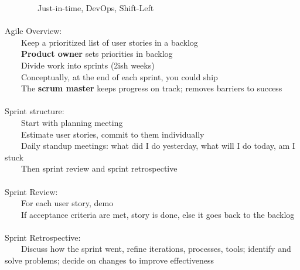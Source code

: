 \documentclass[10pt,letterpaper,unboxed,cm]{article}
\newcommand{\tab}{~~~~}
\begin{document}
\tab \tab Just-in-time, DevOps, Shift-Left\\\\
Agile Overview: \\
\tab Keep a prioritized list of user stories in a backlog\\
\tab \textbf{Product owner} sets priorities in backlog\\
\tab Divide work into sprints (2ish weeks)\\
\tab Conceptually, at the end of each sprint, you could ship\\
\tab The \textbf{scrum master} keeps progress on track; removes barriers to success\\\\
Sprint structure: \\
\tab Start with planning meeting\\
\tab Estimate user stories, commit to them individually\\
\tab Daily standup meetings: what did I do yesterday, what will I do today, am I stuck\\
\tab Then sprint review and sprint retrospective\\\\
Sprint Review: \\
\tab For each user story, demo\\
\tab If acceptance criteria are met, story is done, else it goes back to the backlog\\\\
Sprint Retrospective: \\
\tab Discuss how the sprint went, refine iterations, processes, tools; identify and solve problems; decide on changes to improve effectiveness\\
\end{document}
